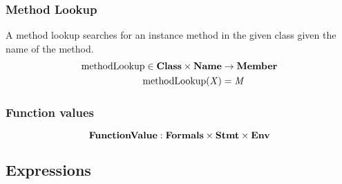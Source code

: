 \documentclass[a4paper,oneside]{article}
\DeclareMathOperator{\methodLookup}{methodLookup}
\newcommand{\synt}[1]{\ensuremath{\text{\textbf{#1}}}}
\DeclareMathOperator{\new}{\synt{new}}
\begin{document}
\subsubsection{Method Lookup}
\label{subsubsec:method-lookup}

A method lookup searches for an instance method in the given class given the name of the method.
\begin{align*}
    \methodLookup \in \dclass \times \mathbf{Name} &\rightarrow \mathbf{Member}\\
    \methodLookup(\idmeta) &= \membermeta
\end{align*}


\subsubsection{Function values}
\label{subsec:function-values}
\[
    \mathbf{FunctionValue} : \mathbf{Formals} \times \mathbf{Stmt} \times \mathbf{Env}
\]


\subsection{Expressions}
\label{sec:expr-syntax}


\newcommand{\VariableGet}[1]{#1}
\newcommand{\VariableSet}[2]{#1=#2}

\newcommand{\PropertyGet}[2]{#1.#2}
\newcommand{\PropertySet}[3]{#1.#2=#3}

\newcommand{\DirectPropertyGet}[2]{#1.\{#2\}}
\newcommand{\DirectPropertySet}[3]{#1.\{#2\}=#3}

\newcommand{\SuperPropertyGet}[1]{\tt{super}.#1}
\newcommand{\SuperPropertySet}[2]{\tt{super}.#1=#2}

\newcommand{\StaticGet}[1]{#1}
\newcommand{\StaticSet}[2]{#1=#2}

\newcommand{\InstanceMethodInvocation}[3]{#1.#2(#3)}
\newcommand{\DInstanceMethodInvocation}[3]{#1.\{#2\}(#3)}
\newcommand{\SuperMethodInvocation}[2]{\tt{super}.#1(#2)}
\newcommand{\StaticInvocation}[2]{#1(#2)}
\newcommand{\New}[2]{\new\, #1\,(#2)}

\newcommand{\Not}[1]{!#1}
\newcommand{\AndExpression}[2]{#1\,\&\&\,#2}
\newcommand{\OrExpression}[2]{#1\,||\,#2}
\newcommand{\ConditionalExpression}[3]{#1\,?\,#2\,:\,#3}
\end{document}
